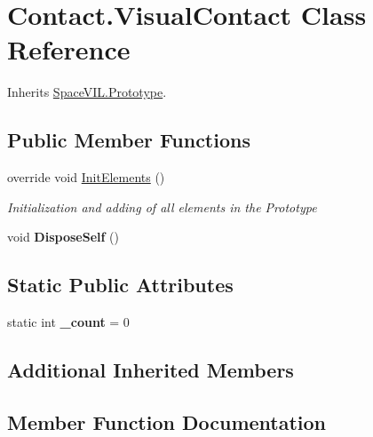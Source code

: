 \hypertarget{class_contact_1_1_visual_contact}{}\section{Contact.\+Visual\+Contact Class Reference}
\label{class_contact_1_1_visual_contact}


Inherits \mbox{\hyperlink{class_space_v_i_l_1_1_prototype}{Space\+V\+I\+L.\+Prototype}}.

\subsection*{Public Member Functions}
\begin{DoxyCompactItemize}
\item 
override void \mbox{\hyperlink{class_contact_1_1_visual_contact_a975573507e5e287632273df844dc7792}{Init\+Elements}} ()
\begin{DoxyCompactList}\small\item\em Initialization and adding of all elements in the Prototype \end{DoxyCompactList}\item 
\mbox{\label{class_contact_1_1_visual_contact_a0ec8e14053a40eda5a15ec7bc30bc95e}} 
void {\bfseries Dispose\+Self} ()
\end{DoxyCompactItemize}
\subsection*{Static Public Attributes}
\begin{DoxyCompactItemize}
\item 
\mbox{\label{class_contact_1_1_visual_contact_aa0678f48d80f3e1698b62a87c767177a}} 
static int {\bfseries \+\_\+count} = 0
\end{DoxyCompactItemize}
\subsection*{Additional Inherited Members}


\subsection{Member Function Documentation}
\mbox{\label{class_contact_1_1_visual_contact_a975573507e5e287632273df844dc7792}} 
